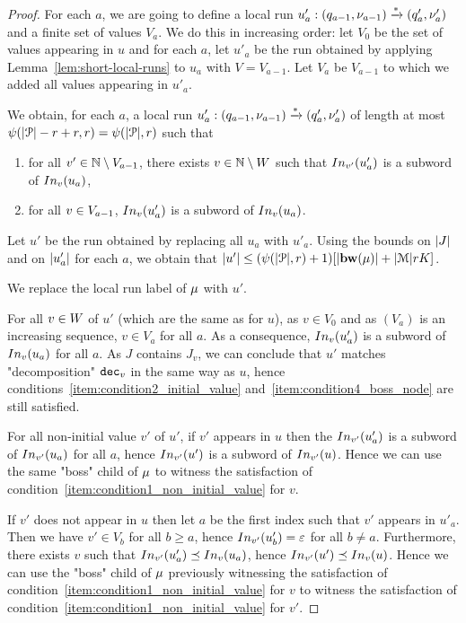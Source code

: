 \begin{proof}
	For each $a$, we are going to define a local run $u'_a : (q_{a-1}, \nu_{a-1}) \xrightarrow{*} (q'_a, \nu'_a)$ and a finite set of values $V_a$.
	We do this in increasing order: let $V_0$ be the set of values appearing in $u$ and for each $a$, let $u'_a$ be the run obtained by applying Lemma~\ref{lem:short-local-runs} to $u_a$ with $V=V_{a-1}$. Let $V_a$ be $V_{a-1}$ to which we added all values appearing in $u'_{a}$.
	
	We obtain, for each $a$, a local run $u'_a : (q_{a-1}, \nu_{a-1}) \xrightarrow{*} (q'_a, \nu'_a)$ of length at most $\psi(|\mathcal{P}|-r+r, r) = \psi(|\mathcal{P}|, r)$ such that 
	\begin{enumerate}
		\item for all $v' \in \mathbb{N} \setminus V_{a-1}$, there exists $v \in \mathbb{N} \setminus W$ such that $\vinput{\aval'}{\localrun'_a}$ is a subword of $\vinput{\aval}{\localrun_a}$,
		\item for all $v \in V_{a-1}$, $\vinput{\aval}{\localrun'_a}$ is a subword of $\vinput{\aval}{\localrun_a}$. 
	\end{enumerate}
Let $u'$ be the run obtained by replacing all $u_a$ with $u'_a$. Using the bounds on $|J|$ and on $|u'_a|$ for each $a$, we obtain that $\size{u'} \leq (\towerfun(\size{\prot}, r) +1) \Large[\size{\bosslabel{\node}}+ \size{\messages}rK\Large]$.

We replace the local run label of $\mu$ with $u'$. 

	For all $v \in W$ of $u'$ (which are the same as for $u$), as $v \in V_0$ and as $(V_a)$ is an increasing sequence, $v \in V_a$ for all $a$. As a consequence, $\vinput{\aval}{\localrun'_a}$ is a subword of $\vinput{\aval}{\localrun_a}$ for all $a$. As $J$ contains $J_v$, we can conclude that $u'$ matches "decomposition" $\mathtt{dec}_v$ in the same way as $u$, hence conditions~\ref{item:condition2_initial_value} and~\ref{item:condition4_boss_node} are still satisfied.
	
	For  all non-initial value $v'$ of $u'$, if $v'$ appears in $u$ then the $\vinput{\aval'}{\localrun'_a}$ is a subword of $\vinput{\aval'}{\localrun_a}$ for all $a$, hence $\vinput{\aval'}{\localrun'}$ is a subword of $\vinput{\aval'}{\localrun}$. Hence we can use the same "boss" child of $\mu$ to witness the satisfaction of condition~\ref{item:condition1_non_initial_value} for $v$.
	
	If $v'$ does not appear in $u$ then let $a$ be the first index such that $v'$ appears in $u'_a$. Then we have $v' \in V_b$ for all $b \geq a$, hence $\vinput{v'}{u'_b} = \epsilon$ for all $b\neq a$. Furthermore, there exists $v$ such that $\vinput{v'}{u'_a} \subword \vinput{v}{u_a}$, hence $\vinput{v'}{u'} \subword \vinput{v}{u}$. Hence we can use the "boss" child of $\mu$ previously witnessing the satisfaction of condition~\ref{item:condition1_non_initial_value} for $v$ to witness the satisfaction of condition~\ref{item:condition1_non_initial_value} for $v'$.
	

\end{proof}
